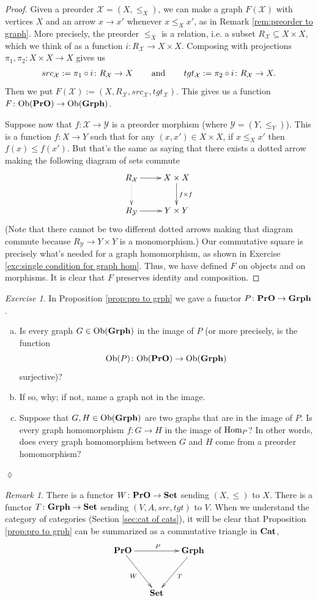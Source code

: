 \documentclass{book}
\def\tn{\textnormal}
\def\mc{\mathcal}
\def\Hom{\tn{Hom}}
\def\Ob{\tn{Ob}}
\def\hsp{\hspace{.3in}}
\def\to{\rightarrow}
\def\taking{\colon}
\def\ss{\subseteq}
\def\Cat{{\bf Cat}}
\def\Grph{{\bf Grph}}
\def\Set{{\bf Set}}
\def\PrO{{\bf PrO}}
\def\mcX{\mc{X}}
\def\mcY{\mc{Y}}
\theoremstyle{remark}
\newtheorem{remark}[subsubsection]{Remark}
\newtheorem{exc}[subsubsection]{Exercise}
\newenvironment{exercise}{\begin{exc}}{\hspace*{\fill}$\lozenge$\end{exc}}
\theoremstyle{definition}
\def\sexc{\begin{enumerate}[a.)]\setlength{\itemsep}{.1cm}\setlength{\parskip}{.1cm}\item}
\def\next{\item}
\def\endsexc{\end{enumerate}}
\begin{document}
\begin{proof}

Given a preorder $\mcX=(X,\leq_X)$, we can make a graph $F(\mcX)$ with vertices $X$ and an arrow $x\to x'$ whenever $x\leq_X x'$, as in Remark \ref{rem:preorder to graph}. More precisely, the preorder $\leq_X$ is a relation, i.e. a subset $R_\mcX\ss X\times X$, which we think of as a function $i\taking R_\mcX\to X\times X$. Composing with projections $\pi_1,\pi_2\taking X\times X\to X$ gives us $$src_\mcX:=\pi_1\circ i\taking R_\mcX\to X\hsp\tn{and}\hsp tgt_\mcX:=\pi_2\circ i\taking R_\mcX\to X.$$ Then we put $F(\mcX):=(X,R_\mcX,src_\mcX,tgt_\mcX)$. This gives us a function $F\taking\Ob(\PrO)\to\Ob(\Grph)$.

Suppose now that $f\taking\mcX\to\mcY$ is a preorder morphism (where $\mcY=(Y,\leq_Y)$). This is a function $f\taking X\to Y$ such that for any $(x,x')\in X\times X$, if $x\leq_X x'$ then $f(x)\leq f(x')$. But that's the same as saying that there exists a dotted arrow making the following diagram of sets commute
$$
\xymatrix{R_\mcX\ar[r]\ar@{..>}[d]&X\times X\ar[d]^{f\times f}\\R_\mcY\ar[r]&Y\times Y
}
$$
(Note that there cannot be two different dotted arrows making that diagram commute because $R_\mcY\to Y\times Y$ is a monomorphism.) 
Our commutative square is precisely what's needed for a graph homomorphism, as shown in Exercise \ref{exc:single condition for graph hom}. Thus, we have defined $F$ on objects and on morphisms. It is clear that $F$ preserves identity and composition.

\end{proof}

\begin{exercise}
In Proposition \ref{prop:pro to grph} we gave a functor $P\taking\PrO\to\Grph$.
\sexc  Is every graph $G\in\Ob(\Grph)$ in the image of $P$ (or more precisely, is the function $$\Ob(P)\taking\Ob(\PrO)\to\Ob(\Grph)$$ surjective)?
\next If so, why; if not, name a graph not in the image.
\next Suppose that $G, H\in\Ob(\Grph)$ are two graphs that are in the image of $P$. Is every graph homomorphism $f\taking G\to H$ in the image of $\Hom_P$? In other words, does every graph homomorphism between $G$ and $H$ come from a preorder homomorphism?
\endsexc
\end{exercise}

\begin{remark}

There is a functor $W\taking\PrO\to\Set$\index{a functor!$\PrO\to\Set$} sending $(X,\leq)$ to $X$. There is a functor $T\taking\Grph\to\Set$\index{a functor!$\Grph\to\Set$} sending $(V,A,src,tgt)$ to $V$. When we understand the category of categories (Section \ref{sec:cat of cats}), it will be clear that Proposition \ref{prop:pro to grph} can be summarized as a commutative triangle in $\Cat$, 
$$
\xymatrix@=15pt{\PrO\ar[rr]^P\ar[ddr]_W&&\Grph\ar[ddl]^T\\\\&\Set}
$$

\end{remark}
\end{document}
